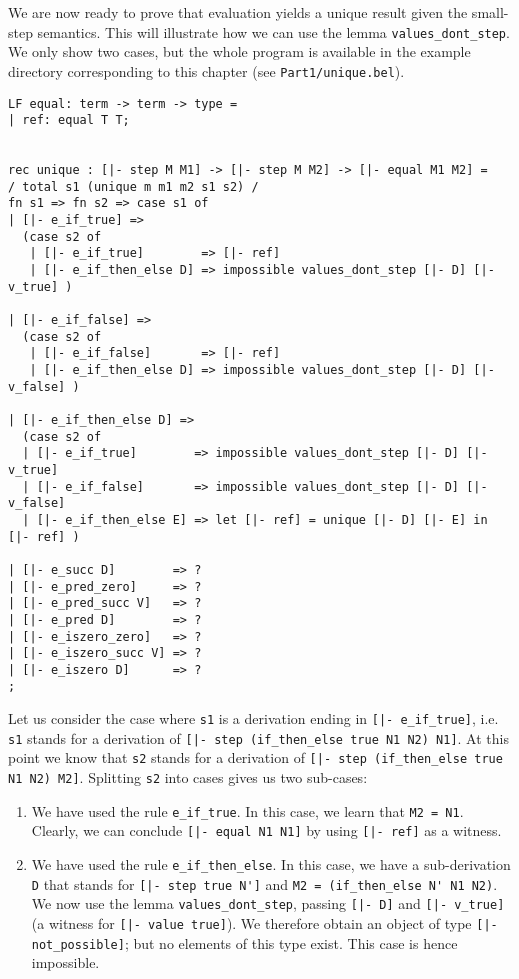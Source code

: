 We are now ready to prove that evaluation yields a unique result given the
small-step semantics. This will illustrate how we can use the lemma
\lstinline!values_dont_step!. We only show two cases, but the whole program is
available in the example directory corresponding to this chapter
(see \verb|Part1/unique.bel|).

\begin{lstlisting}
LF equal: term -> term -> type =
| ref: equal T T;


rec unique : [|- step M M1] -> [|- step M M2] -> [|- equal M1 M2] =
/ total s1 (unique m m1 m2 s1 s2) /
fn s1 => fn s2 => case s1 of
| [|- e_if_true] =>
  (case s2 of
   | [|- e_if_true]        => [|- ref]
   | [|- e_if_then_else D] => impossible values_dont_step [|- D] [|- v_true] )

| [|- e_if_false] =>
  (case s2 of
   | [|- e_if_false]       => [|- ref]
   | [|- e_if_then_else D] => impossible values_dont_step [|- D] [|- v_false] )

| [|- e_if_then_else D] =>
  (case s2 of
  | [|- e_if_true]        => impossible values_dont_step [|- D] [|- v_true]
  | [|- e_if_false]       => impossible values_dont_step [|- D] [|- v_false]
  | [|- e_if_then_else E] => let [|- ref] = unique [|- D] [|- E] in  [|- ref] )

| [|- e_succ D]        => ?
| [|- e_pred_zero]     => ?
| [|- e_pred_succ V]   => ?
| [|- e_pred D]        => ?
| [|- e_iszero_zero]   => ?
| [|- e_iszero_succ V] => ?
| [|- e_iszero D]      => ?
;
\end{lstlisting}

Let us consider the case where \lstinline!s1! is a derivation ending in
\lstinline![|- e_if_true]!, i.e. \lstinline!s1! stands for a derivation of
\lstinline![|- step (if_then_else true N1 N2) N1]!. At this point we know that \lstinline!s2! stands
for a derivation of \lstinline![|- step (if_then_else true N1 N2) M2]!. Splitting
\lstinline!s2! into cases gives us two sub-cases:
\begin{enumerate}
\item We have used the rule
\lstinline!e_if_true!. In this case, we learn that
\lstinline!M2 = N1!. Clearly, we can conclude \lstinline![|- equal N1 N1]! by
using \lstinline![|- ref]! as a witness.

\item We have used the rule \lstinline!e_if_then_else!. In this case, we have a
  sub-derivation \lstinline!D! that stands for \lstinline![|- step true N']! and \lstinline!M2 = (if_then_else N' N1 N2)!.
We now use the lemma \lstinline!values_dont_step!, passing \lstinline![|- D]! and \lstinline![|- v_true]! (a witness
for \lstinline![|- value true]!).
We therefore obtain an object of type \lstinline![|- not_possible]!; but no
elements of this type exist. This case is hence impossible.
\end{enumerate}

